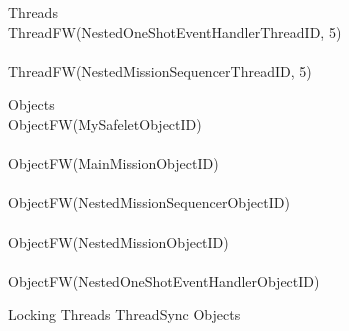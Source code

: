 %
\begin{circus}
\circprocess Threads \circdef  \\
\circblockopen
ThreadFW(NestedOneShotEventHandlerThreadID, 5) \\
\interleave \\
ThreadFW(NestedMissionSequencerThreadID, 5) \\

\circblockclose
\end{circus}
%
%
\begin{circus}
\circprocess Objects \circdef \\
\circblockopen
ObjectFW(MySafeletObjectID) \\
\interleave \\
ObjectFW(MainMissionObjectID) \\
\interleave \\
ObjectFW(NestedMissionSequencerObjectID) \\
\interleave \\
ObjectFW(NestedMissionObjectID) \\
\interleave \\
ObjectFW(NestedOneShotEventHandlerObjectID) \\

\circblockclose
\end{circus}
%
%
\begin{circus}
\circprocess Locking \circdef Threads \lpar ThreadSync \rpar Objects
\end{circus}

